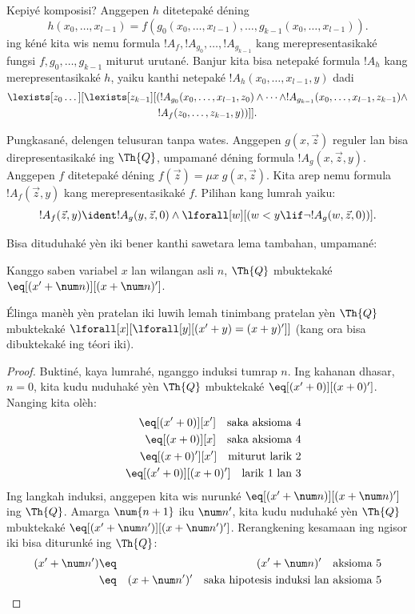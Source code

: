 \documentclass[../../../include/open-logic-section]{subfiles}
\begin{document}
Kepiyé komposisi? Anggepen $h$ ditetepaké déning
\[
h(x_0,\dots,x_{l-1}) = f(g_0(x_0,\dots,x_{l-1}), \dots,
g_{k-1}(x_0,\dots,x_{l-1})).
\]
ing kéné kita wis nemu formula $!A_f, !A_{g_0}, \dots,
!A_{g_{k-1}}$ kang merepresentasikaké fungsi
$f,g_0,\dots,g_{k-1}$ miturut urutané. Banjur kita bisa
netepaké formula $!A_h$ kang merepresentasikaké $h$,
yaiku kanthi netepaké $!A_h(x_0,\dots,x_{l-1},y)$ dadi
\begin{multline*}
  \lexists[z_0\dots][\lexists[z_{k-1}][(!A_{g_0}(x_0,\dots,x_{l-1},z_0) \land
  \dots \land !A_{g_{k-1}}(x_0,\dots,x_{l-1},z_{k-1}) \land\\
  !A_f(z_0,\dots,z_{k-1},y))]].
\end{multline*}

Pungkasané, delengen telusuran tanpa wates. Anggepen
$g(x,\vec z)$ reguler lan bisa direpresentasikaké ing $\Th{Q}$,
umpamané déning formula $!A_g(x,\vec z,y)$.
Anggepen $f$ ditetepaké déning $f(\vec z) = \mu x \; g(x,\vec z)$.
Kita arep nemu formula $!A_f(\vec z,y)$ kang merepresentasikaké
$f$. Pilihan kang lumrah yaiku:
\[
!A_f(\vec z,y) \ident !A_g(y,\vec z,0) \land \lforall[w][(w < y
\lif \lnot !A_g(w,\vec z,0))].
\]

Bisa dituduhaké yèn iki bener kanthi sawetara lema tambahan,
umpamané:

\begin{lem}
  Kanggo saben variabel $x$ lan wilangan asli $n$,
  $\Th{Q}$ mbuktekaké $\eq[(x' + \num n)][(x + \num n)']$.
\end{lem}

Élinga manèh yèn pratelan iki luwih lemah tinimbang
pratelan yèn $\Th{Q}$ mbuktekaké
$\lforall[x][\lforall[y][(x' + y) = (x +y)']]$
(kang ora bisa dibuktekaké ing téori iki).

\begin{proof}
Buktiné, kaya lumrahé, nganggo induksi tumrap $n$.
Ing kahanan dhasar, $n = 0$, kita kudu nuduhaké yèn
$\Th{Q}$ mbuktekaké $\eq[(x'+0)][(x+0)']$. Nanging kita olèh:
\begin{eqnarray*}
& & \eq[(x' + 0)][x'] \quad \text{saka aksioma 4} \\
& & \eq[(x + 0)][x] \quad \text{saka aksioma 4} \\
& & \eq[(x+0)'][x'] \quad \text{miturut larik 2} \\
& & \eq[(x' + 0)][(x + 0)'] \quad \text{larik 1 lan 3}
\end{eqnarray*}
Ing langkah induksi, anggepen kita wis nurunké $\eq[(x' +
  \num n)][(x + \num n)']$ ing $\Th{Q}$.
Amarga $\num{n+1}$ iku $\num n'$, kita kudu nuduhaké yèn
$\Th{Q}$ mbuktekaké $\eq[(x' + \num n')][(x + \num n')']$.
Rerangkening kesamaan ing ngisor iki bisa diturunké ing $\Th{Q}$:
\begin{eqnarray*}
(x' + \num n') & \eq & (x' + \num n)' \quad \text{aksioma 5} \\
& \eq & (x + \num n')' \quad \text{saka hipotesis induksi lan aksioma 5}
\end{eqnarray*}
\end{proof}
\end{document}
